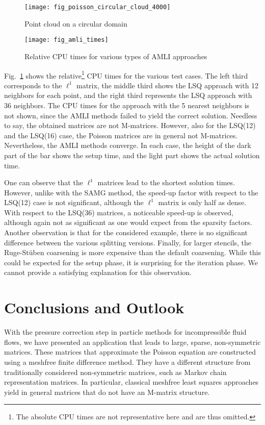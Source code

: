 \documentclass[reqno]{amsart}
\theoremstyle{plain}
\theoremstyle{definition}
\theoremstyle{remark}
\begin{document}
\begin{figure}
\hspace{-1.3cm}
\begin{minipage}[t]{.44\textwidth}
\centering
\texttt{[image: fig\_poisson\_circular\_cloud\_4000]}
\caption{Point cloud on a circular domain}
\label{seibold:fig_poisson2d_cloud}
\end{minipage}
\hfill
\begin{minipage}[t]{.63\textwidth}
\centering
\texttt{[image: fig\_amli\_times]}
\caption{Relative CPU times for various types of AMLI approaches}
\label{seibold:fig_amli_times}
\end{minipage}
\end{figure}

Fig.~\ref{seibold:fig_amli_times} shows the relative\footnote{The absolute CPU times
are not representative here and are thus omitted.} CPU times for the various test
cases. The left third corresponds to the $\ell^1$ matrix, the middle third shows the
LSQ approach with 12 neighbors for each point, and the right third represents
the LSQ approach with 36 neighbors. The CPU times for the approach with the 5 nearest
neighbors is not shown, since the AMLI methods failed to yield the correct solution.
Needless to say, the obtained matrices are not M-matrices. However, also for the
LSQ(12) and the LSQ(16) case, the Poisson matrices are in general not M-matrices.
Nevertheless, the AMLI methods converge. In each case, the height of the dark part
of the bar shows the setup time, and the light part shows the actual solution time.

One can observe that the $\ell^1$ matrices lead to the shortest solution times.
However, unlike with the SAMG method, the speed-up factor with respect to the LSQ(12)
case is not significant, although the $\ell^1$ matrix is only half as dense. With
respect to the LSQ(36) matrices, a noticeable speed-up is observed, although again not
as significant as one would expect from the sparsity factors. Another observation is
that for the considered example, there is no significant difference between the
various splitting versions. Finally, for larger stencils, the Ruge-St{\"u}ben
coarsening is more expensive than the default coarsening. While this could be
expected for the setup phase, it is surprising for the iteration phase.
We cannot provide a satisfying explanation for this observation.

\section{Conclusions and Outlook}
\label{seibold:sec:conclusions_outlook}
With the pressure correction step in particle methods for incompressible fluid flows,
we have presented an application that leads to large, sparse, non-symmetric matrices.
These matrices that approximate the Poisson equation are constructed using a
meshfree finite difference method. They have a different structure from traditionally
considered non-symmetric matrices, such as Markov chain representation matrices.
In particular, classical meshfree least squares approaches yield in general matrices
that do not have an M-matrix structure.
\end{document}

